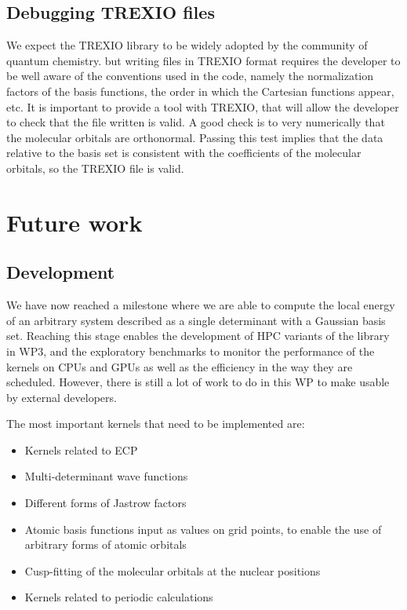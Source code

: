 \subsection{Debugging TREXIO files}

We expect the \ac{TREXIO} library to be widely adopted by the community of
quantum chemistry. but writing files in \ac{TREXIO} format requires the developer
to be well aware of the conventions used in the code, namely the normalization factors
of the basis functions, the order in which the Cartesian functions appear, etc.
It is important to provide a tool with \ac{TREXIO}, that will allow the developer to
check that the file written is valid. A good check is to very numerically that the
molecular orbitals are orthonormal. Passing this test implies that the data
relative to the basis set is consistent with the coefficients of the molecular
orbitals, so the \ac{TREXIO} file is valid.

\section{Future work}

\subsection{Development}

We have now reached a milestone where we are able to compute the local energy of an
arbitrary system described as a single determinant with a Gaussian basis set.
Reaching this stage enables the development of \ac{HPC} variants of the library in
\ac{WP}3, and the exploratory benchmarks to monitor the performance of the kernels on
CPUs and \acp{GPU} as well as the efficiency in the way they are scheduled.
However, there is still a lot of work to do in this \ac{WP} to make \QMCkl{}
usable by external developers.

The most important kernels that need to be implemented are:
\begin{itemize}
  \item Kernels related to \ac{ECP}
  \item Multi-determinant wave functions
  \item Different forms of Jastrow factors
  \item Atomic basis functions input as values on grid points, to enable the use of
        arbitrary forms of atomic orbitals
  \item Cusp-fitting of the molecular orbitals at the nuclear positions
  \item Kernels related to periodic calculations
\end{itemize}

